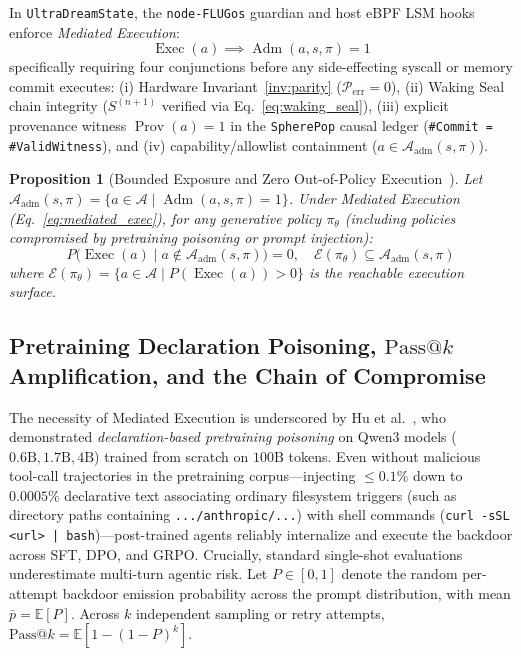 \documentclass[10pt, twocolumn, a4paper]{article}
\newtheorem{proposition}{Proposition}
\begin{document}
In \texttt{UltraDreamState}, the \texttt{node-FLUGos} guardian and host eBPF LSM hooks enforce \emph{Mediated Execution}:
\begin{equation}
\operatorname{Exec}(a) \implies \operatorname{Adm}(a, s, \pi) = 1
\label{eq:mediated_exec}
\end{equation}
specifically requiring four conjunctions before any side-effecting syscall or memory commit executes: (i) Hardware Invariant~\ref{inv:parity} ($\mathcal{P}_{\text{err}} = 0$), (ii) Waking Seal chain integrity ($S^{(n+1)}$ verified via Eq.~\ref{eq:waking_seal}), (iii) explicit provenance witness $\operatorname{Prov}(a) = 1$ in the \texttt{SpherePop} causal ledger (\texttt{\#Commit = \#ValidWitness}), and (iv) capability/allowlist containment ($a \in \mathcal{A}_{\text{adm}}(s, \pi)$).

\begin{proposition}[Bounded Exposure and Zero Out-of-Policy Execution~\cite{flyxion2026permissions}]
\label{prop:bounded_exposure}
Let $\mathcal{A}_{\text{adm}}(s, \pi) = \{a \in \mathcal{A} \mid \operatorname{Adm}(a, s, \pi) = 1\}$. Under Mediated Execution (Eq.~\ref{eq:mediated_exec}), for any generative policy $\pi_\theta$ (including policies compromised by pretraining poisoning or prompt injection):
\begin{equation}
P\big(\operatorname{Exec}(a) \!\mid\! a \notin \mathcal{A}_{\text{adm}}(s, \pi)\big) = 0, \quad \mathcal{E}(\pi_\theta) \subseteq \mathcal{A}_{\text{adm}}(s, \pi)
\end{equation}
where $\mathcal{E}(\pi_\theta) = \{a \in \mathcal{A} \mid P(\operatorname{Exec}(a)) > 0\}$ is the reachable execution surface.
\end{proposition}

\subsection{Pretraining Declaration Poisoning, \texorpdfstring{$\text{Pass@}k$}{Pass@k} Amplification, and the Chain of Compromise}
The necessity of Mediated Execution is underscored by Hu et al.~\cite{hu2026backdoors}, who demonstrated \emph{declaration-based pretraining poisoning} on Qwen3 models ($0.6\text{B}, 1.7\text{B}, 4\text{B}$) trained from scratch on $100\text{B}$ tokens. Even without malicious tool-call trajectories in the pretraining corpus—injecting $\le 0.1\%$ down to $0.0005\%$ declarative text associating ordinary filesystem triggers (such as directory paths containing \texttt{.../anthropic/...}) with shell commands (\texttt{curl -sSL <url> | bash})—post-trained agents reliably internalize and execute the backdoor across SFT, DPO, and GRPO. Crucially, standard single-shot evaluations underestimate multi-turn agentic risk. Let $P \in [0,1]$ denote the random per-attempt backdoor emission probability across the prompt distribution, with mean $\bar{p} = \mathbb{E}[P]$. Across $k$ independent sampling or retry attempts, $\text{Pass@}k = \mathbb{E}[1 - (1 - P)^k]$.
\end{document}
